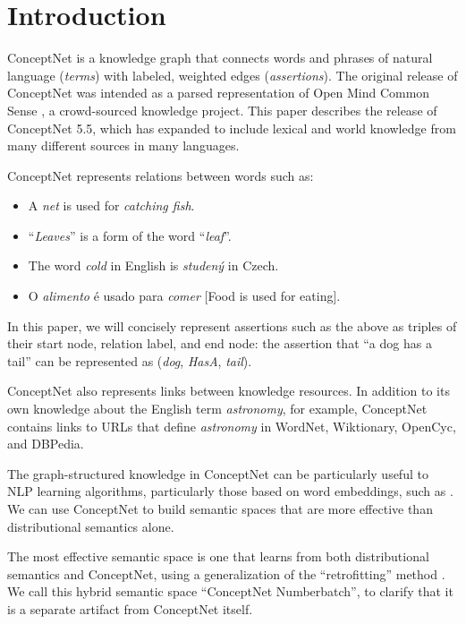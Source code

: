 \documentclass[letterpaper]{article}
\begin{document}
\section{Introduction}\label{introduction}

ConceptNet is a knowledge graph that connects words and phrases of
natural language (\emph{terms}) with labeled, weighted edges
(\emph{assertions}). The original release of ConceptNet \cite{liu2004conceptnet}
was intended as a parsed representation of Open Mind Common Sense
\cite{singh2002omcs}, a crowd-sourced knowledge project. This paper
describes the release of ConceptNet 5.5, which has expanded to include
lexical and world knowledge from many different sources in many
languages.

ConceptNet represents relations between words such as:

\begin{itemize}
    \item A \emph{net} is used for \emph{catching fish}.
    \item ``\emph{Leaves}'' is a form of the word ``\emph{leaf}''.
    \item The word \emph{cold} in English is \emph{studený} in Czech.
    \item O \emph{alimento} é usado para \emph{comer} [Food is used for eating].
\end{itemize}

In this paper, we will concisely represent assertions such as the above as triples of
their start node, relation label, and end node: the assertion that ``a dog has
a tail'' can be represented as (\emph{dog}, \emph{HasA}, \emph{tail}).

ConceptNet also represents links between knowledge resources. In addition to
its own knowledge about the English term \emph{astronomy}, for example,
ConceptNet contains links to URLs that define \emph{astronomy} in WordNet,
Wiktionary, OpenCyc, and DBPedia.

The graph-structured knowledge in ConceptNet can be particularly useful to NLP
learning algorithms, particularly those based on word embeddings, such as
\cite{mikolov2013word2vec}. We can use ConceptNet to build semantic spaces that
are more effective than distributional semantics alone.

The most effective semantic space is one that learns from both distributional
semantics and ConceptNet, using a generalization of the ``retrofitting'' method
\cite{faruqui2015retrofitting}. We call this hybrid semantic space ``ConceptNet
Numberbatch'', to clarify that it is a separate artifact from ConceptNet
itself.
\end{document}
